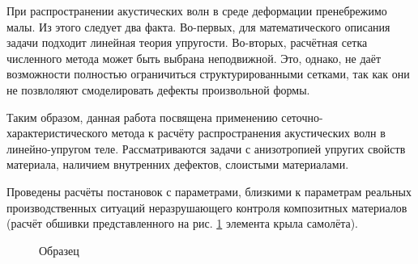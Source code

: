 При распространении акустических волн в среде деформации пренебрежимо малы. Из этого следует два факта. Во-первых, для математического описания задачи подходит линейная теория упругости. Во-вторых, расчётная сетка численного метода может быть выбрана неподвижной. Это, однако, не даёт возможности полностью ограничиться структурированными сетками, так как они не позвлоляют смоделировать дефекты произвольной формы.

Таким образом, данная работа посвящена применению сеточно\hyp{}характеристического метода к расчёту распространения акустических волн в линейно-упругом теле. Рассматриваются задачи с анизотропией упругих свойств материала, наличием внутренних дефектов, слоистыми материалами. 

Проведены расчёты постановок с параметрами, близкими к параметрам реальных производственных ситуаций неразрушающего контроля композитных материалов (расчёт обшивки представленного на рис. \ref{pic:construction} элемента крыла самолёта).

\begin{figure}[H]
	\caption{Образец}
	\label{pic:construction}
\end{figure}